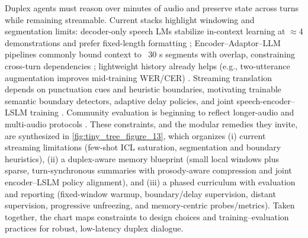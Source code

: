 \documentclass{article}
\begin{document}
Duplex agents must reason over minutes of audio and preserve state across turns while remaining streamable. Current stacks highlight windowing and segmentation limits: decoder-only speech LMs stabilize in-context learning at $\approx$4 demonstrations and prefer fixed-length formatting \cite{hsu2024exploringcontextlearningtextlessspeechla}; Encoder--Adaptor--LLM pipelines commonly bound context to ~30 s segments with overlap, constraining cross-turn dependencies \cite{nguyen2025qwenvsgemmaintegrationwhispercomparative}; lightweight history already helps (e.g., two-utterance augmentation improves mid-training WER/CER) \cite{li2025seewossubmissionmlcslmlessonslearnedspee}. Streaming translation depends on punctuation cues and heuristic boundaries, motivating trainable semantic boundary detectors, adaptive delay policies, and joint speech-encoder--LSLM training \cite{guo2025streamuniachievingstreamingspeechtransla}. Community evaluation is beginning to reflect longer-audio and multi-audio protocols \cite{huang2025dynamicsuperbphase2collaborativelyexpand}. These constraints, and the modular remedies they invite, are synthesized in \autoref{fig:tiny_tree_figure_13}, which organizes (i) current streaming limitations (few-shot ICL saturation, segmentation and boundary heuristics), (ii) a duplex-aware memory blueprint (small local windows plus sparse, turn-synchronous summaries with prosody-aware compression and joint encoder--LSLM policy alignment), and (iii) a phased curriculum with evaluation and reporting (fixed-window warmup, boundary/delay supervision, distant supervision, progressive unfreezing, and memory-centric probes/metrics). Taken together, the chart maps constraints to design choices and training--evaluation practices for robust, low-latency duplex dialogue.
\end{document}
